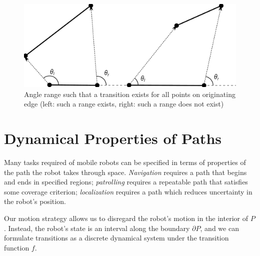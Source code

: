 \documentclass[]{styles/svproc}  %
\begin{document}

\begin{figure}
    \centering
    \includegraphics[width=0.7\linewidth]{figures/bouncerange_min.pdf}
    \caption{Angle range such that a transition exists for all points on
originating edge (left: such a range exists, right: such a range does not
exist)}
\label{fig:bounce_range}
\end{figure}

\section{Dynamical Properties of Paths}

Many tasks required of mobile robots can be specified in terms of properties of
the path the robot takes through space. \emph{Navigation} requires a path that
begins and ends in specified regions; \emph{patrolling} requires a repeatable
path that satisfies some coverage criterion; \emph{localization} requires a path
which reduces uncertainty in the robot's position.

Our motion strategy allows us to disregard the robot's motion in the interior of
$P$. Instead, the robot's state is an interval 
along the boundary $\partial P$, and we can formulate transitions as a discrete
dynamical system under the transition function $f$. 
\end{document}
